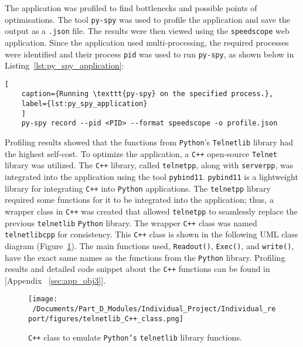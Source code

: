 The application was profiled to find bottlenecks and possible points of optimisations. The tool \texttt{py-spy} was used to profile the application and save the output as a \texttt{.json} file. The results were then viewed using the \texttt{speedscope} web application\cite{speedscope_app}. Since the application used multi-processing, the required processes were identified and their process \texttt{pid} was used to run \texttt{py-spy}, as shown below in Listing~\ref{lst:py_spy_application}:

\begin{lstlisting}[
	caption={Running \texttt{py-spy} on the specified process.},
	label={lst:py_spy_application}
	]
	py-spy record --pid <PID> --format speedscope -o profile.json 
\end{lstlisting}


Profiling results showed that the functions from \texttt{Python}'s \texttt{Telnetlib} library had the highest self-cost. To optimize the application, a \texttt{C++} open-source \texttt{Telnet} library was utilized. The \texttt{C++} library, called \texttt{telnetpp},\cite{telnetpp_library} along with \texttt{serverpp},\cite{serverpp_library} was integrated into the application using the tool \texttt{pybind11}. \texttt{pybind11} is a lightweight library for integrating \texttt{C++} into \texttt{Python} applications. The \texttt{telnetpp} library required some functions for it to be integrated into the application; thus, a wrapper class in \texttt{C++} was created that allowed \texttt{telnetpp} to seamlessly replace the previous \texttt{telnetlib} \texttt{Python} library. The wrapper \texttt{C++} class was named \texttt{telnetlibcpp} for consistency. This \texttt{C++} class is shown in the following UML class diagram (Figure~\ref{fig:telnetlibcpp_UML}). The main functions used, \texttt{Readout()}, \texttt{Exec()}, and \texttt{write()}, have the exact same names as the functions from the \texttt{Python} library. Profiling results and detailed code snippet about the \texttt{C++} functions can be found in [Appendix ~\ref{sec:app_obj3}]. 

\begin{figure}[htbp] %
	\centering
	\texttt{[image: ~/Documents/Part\_D\_Modules/Individual\_Project/Individual\_report/figures/telnetlib\_C++\_class.png]} %
	\caption{\texttt{C++} class to emulate \texttt{Python's} \texttt{telnetlib} library functions.}
	\label{fig:telnetlibcpp_UML} %
\end{figure}

